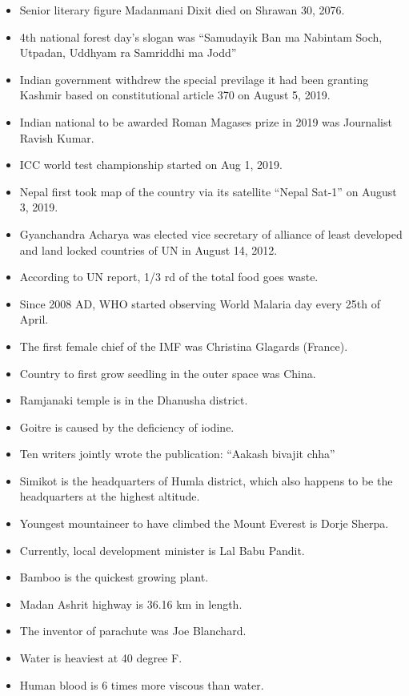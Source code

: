 \documentclass[
  openany]{book}
\begin{document}
\begin{itemize}
\item
  Senior literary figure Madanmani Dixit died on Shrawan 30, 2076.
\item
  4th national forest day's slogan was ``Samudayik Ban ma Nabintam Soch, Utpadan, Uddhyam ra Samriddhi ma Jodd''
\item
  Indian government withdrew the special previlage it had been granting Kashmir based on constitutional article 370 on August 5, 2019.
\item
  Indian national to be awarded Roman Magases prize in 2019 was Journalist Ravish Kumar.
\item
  ICC world test championship started on Aug 1, 2019.
\item
  Nepal first took map of the country via its satellite ``Nepal Sat-1'' on August 3, 2019.
\item
  Gyanchandra Acharya was elected vice secretary of alliance of least developed and land locked countries of UN in August 14, 2012.
\item
  According to UN report, 1/3 rd of the total food goes waste.
\item
  Since 2008 AD, WHO started observing World Malaria day every 25th of April.
\item
  The first female chief of the IMF was Christina Glagards (France).
\item
  Country to first grow seedling in the outer space was China.
\item
  Ramjanaki temple is in the Dhanusha district.
\item
  Goitre is caused by the deficiency of iodine.
\item
  Ten writers jointly wrote the publication: ``Aakash bivajit chha''
\item
  Simikot is the headquarters of Humla district, which also happens to be the headquarters at the highest altitude.
\item
  Youngest mountaineer to have climbed the Mount Everest is Dorje Sherpa.
\item
  Currently, local development minister is Lal Babu Pandit.
\item
  Bamboo is the quickest growing plant.
\item
  Madan Ashrit highway is 36.16 km in length.
\item
  The inventor of parachute was Joe Blanchard.
\item
  Water is heaviest at 40 degree F.
\item
  Human blood is 6 times more viscous than water.

\end{itemize}
\end{document}
